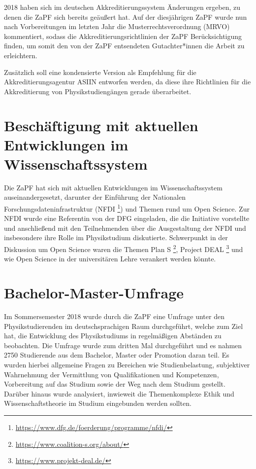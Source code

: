 2018 haben sich im deutschen Akkreditierungssystem Änderungen ergeben, 
zu denen die ZaPF sich bereits geäußert hat. 
Auf der diesjährigen ZaPF wurde nun nach Vorbereitungen im letzten Jahr die Musterrechtsverordnung (MRVO) kommentiert, 
sodass die Akkreditierungsrichtlinien der ZaPF Berücksichtigung finden, um somit den von der ZaPF entsendeten Gutachter*innen die Arbeit zu erleichtern.

Zusätzlich soll eine kondensierte Version als Empfehlung für die Akkreditierungsagentur ASIIN entworfen werden, da diese ihre Richtlinien für die Akkreditierung von Physikstudiengängen gerade überarbeitet. 

\section*{Beschäftigung mit aktuellen Entwicklungen im Wissenschaftssystem}

Die ZaPF hat sich mit aktuellen Entwicklungen im Wissenschaftssystem auseinandergesetzt, darunter der Einführung der Nationalen Forschungsdateninfrastruktur (NFDI \footnote{\url{https://www.dfg.de/foerderung/programme/nfdi/}}) und Themen rund um Open Science. Zur NFDI wurde eine Referentin von der DFG eingeladen, die die Initiative vorstellte und anschließend mit den Teilnehmenden über die Ausgestaltung der NFDI und insbesondere ihre Rolle im Physikstudium diskutierte.
Schwerpunkt in der Diskussion um Open Science waren die Themen Plan S \footnote{\url{https://www.coalition-s.org/about/}}, Project DEAL \footnote{\url{https://www.projekt-deal.de/}} und wie Open Science in der universitären Lehre verankert werden könnte.

\section*{Bachelor-Master-Umfrage}

Im Sommersemester 2018 wurde durch die ZaPF eine Umfrage unter den Physikstudierenden im deutschsprachigen Raum durchgeführt, welche zum Ziel hat, die Entwicklung des Physikstudiums in regelmäßigen Abständen zu beobachten. 
Die Umfrage wurde zum dritten Mal durchgeführt und es nahmen 2750 Studierende aus dem Bachelor, Master oder Promotion daran teil. Es wurden hierbei allgemeine Fragen zu Bereichen wie Studienbelastung, subjektiver Wahrnehmung der Vermittlung von Qualifikationen und Kompetenzen, Vorbereitung auf das Studium sowie der Weg nach dem Studium gestellt. Darüber hinaus wurde analysiert, inwieweit die Themenkomplexe Ethik und Wissenschaftstheorie im Studium eingebunden werden sollten.

